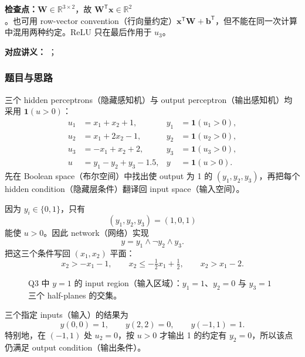 \textbf{检查点：}$\bm W\in\mathbb R^{3\times2}$，故 $\bm W^{\mathsf T}\bm x\in\mathbb R^2$。也可用 row-vector convention（行向量约定）$\bm x^{\mathsf T}\bm W+\bm b^{\mathsf T}$，但不能在同一次计算中混用两种约定。ReLU 只在最后作用于 $u_3$。


\textbf{对应讲义：}
；

\subsubsection*{题目与思路}

三个 hidden perceptrons（隐藏感知机）与 output perceptron（输出感知机）均采用 $\mathbf 1(u>0)$：
\begin{align*}
  u_1&=x_1+x_2+1,      & y_1&=\mathbf 1(u_1>0),\\
  u_2&=x_1+2x_2-1,     & y_2&=\mathbf 1(u_2>0),\\
  u_3&=-x_1+x_2+2,     & y_3&=\mathbf 1(u_3>0),\\
  u&=y_1-y_2+y_3-1.5, & y&=\mathbf 1(u>0).
\end{align*}
先在 Boolean space（布尔空间）中找出使 output 为 1 的 $(y_1,y_2,y_3)$，再把每个 hidden condition（隐藏层条件）翻译回 input space（输入空间）。

\begin{checkedsolution}
因为 $y_i\in\{0,1\}$，只有
\[
  (y_1,y_2,y_3)=(1,0,1)
\]
能使 $u>0$。因此 network（网络）实现
\[
  \boxed{y=y_1\land\neg y_2\land y_3}.
\]
把这三个条件写回 $(x_1,x_2)$ 平面：
\[
  \boxed{x_2>-x_1-1,\qquad
         x_2\le-\tfrac12x_1+\tfrac12,\qquad
         x_2>x_1-2.}
\]

\begin{figure}[htbp]
  \centering
  \resizebox{0.78\textwidth}{!}{}
  \caption{Q3 中 $y=1$ 的 input region（输入区域）：$y_1=1$、$y_2=0$ 与 $y_3=1$ 三个 half-planes 的交集。}
  \label{fig:sc4001-tut01-input-region}
\end{figure}

三个指定 inputs（输入）的结果为
\[
  \boxed{y(0,0)=1,\qquad y(2,2)=0,\qquad y(-1,1)=1.}
\]
特别地，在 $(-1,1)$ 处 $u_2=0$，按 $u>0$ 才输出 1 的约定有 $y_2=0$，所以该点仍满足 output condition（输出条件）。
\end{checkedsolution}

